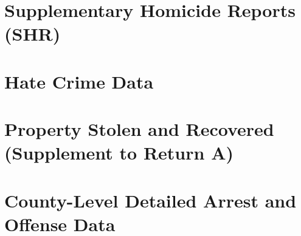 \documentclass[
  12pt,
]{book}
\begin{document}
\hypertarget{shr}{%
\chapter{Supplementary Homicide Reports (SHR)}\label{shr}}

\hypertarget{hate_crimes}{%
\chapter{Hate Crime Data}\label{hate_crimes}}

\hypertarget{stolen_property}{%
\chapter{Property Stolen and Recovered (Supplement to Return A)}\label{stolen_property}}

\hypertarget{county_level}{%
\chapter{County-Level Detailed Arrest and Offense Data}\label{county_level}}

  
\end{document}
